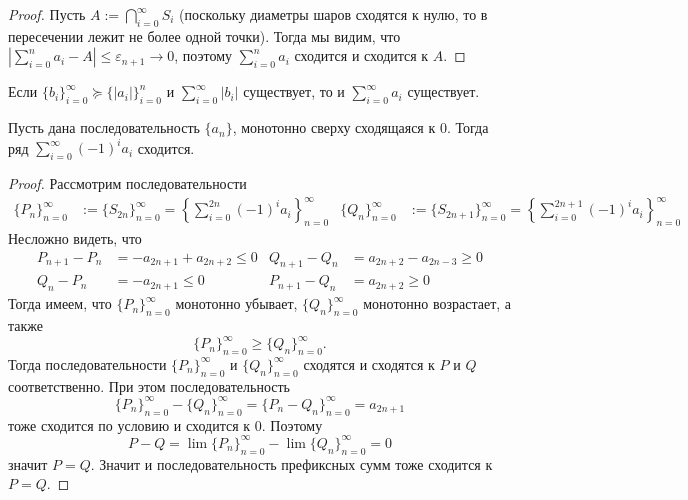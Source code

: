 \documentclass[12pt,a4paper]{article}
\begin{document}
\begin{proof}
        Пусть $A := \bigcap_{i=0}^\infty S_i$ (поскольку диаметры шаров сходятся к нулю, то в пересечении лежит не более одной точки). Тогда мы видим, что $|\sum_{i=0}^n a_i - A| \leqslant \varepsilon_{n+1} \to 0$, поэтому $\sum_{i=0}^n a_i$ сходится и сходится к $A$.
    \end{proof}

    \begin{corollary}
        Если $\{b_i\}_{i=0}^\infty \succcurlyeq \{|a_i|\}_{i=0}^n$ и $\sum_{i=0}^\infty |b_i|$ существует, то и $\sum_{i=0}^\infty a_i$ существует.
    \end{corollary}

    \begin{theorem}
        Пусть дана последовательность $\{a_n\}$, монотонно сверху сходящаяся к $0$. Тогда ряд $\sum_{i=0}^\infty (-1)^i a_i$ сходится.
    \end{theorem}

    \begin{proof}
        Рассмотрим последовательности 
        \begin{align*}
            \{P_n\}_{n=0}^\infty &:= \{S_{2n}\}_{n=0}^\infty = \left\{\sum_{i=0}^{2n} (-1)^i a_i\right\}_{n=0}^\infty&
            \{Q_n\}_{n=0}^\infty &:= \{S_{2n + 1}\}_{n=0}^\infty = \left\{\sum_{i=0}^{2n + 1} (-1)^i a_i\right\}_{n=0}^\infty
        \end{align*}
        Несложно видеть, что 
        \begin{align*}
            P_{n+1} - P_n &= - a_{2n+1} + a_{2n+2} \leqslant 0&
            Q_{n+1} - Q_n &= a_{2n+2} - a_{2n-3} \geqslant 0\\
            Q_{n} - P_{n} &= - a_{2n+1} \leqslant 0&
            P_{n+1} - Q_{n} &= a_{2n+2} \geqslant 0
        \end{align*}
        Тогда имеем, что $\{P_n\}_{n=0}^\infty$ монотонно убывает, $\{Q_n\}_{n=0}^\infty$ монотонно возрастает, а также
        \[\{P_n\}_{n=0}^\infty \geqslant \{Q_n\}_{n=0}^\infty.\]
        Тогда последовательности $\{P_n\}_{n=0}^\infty$ и $\{Q_n\}_{n=0}^\infty$ сходятся и сходятся к $P$ и $Q$ соответственно. При этом последовательность
        \[\{P_n\}_{n=0}^\infty - \{Q_n\}_{n=0}^\infty = \{P_n - Q_n\}_{n=0}^\infty = a_{2n+1}\]
        тоже сходится по условию и сходится к $0$. Поэтому
        \[P - Q = \lim \{P_n\}_{n=0}^\infty - \lim \{Q_n\}_{n=0}^\infty = 0\]
        значит $P=Q$. Значит и последовательность префиксных сумм тоже сходится к $P=Q$.
    \end{proof}
\end{document}
